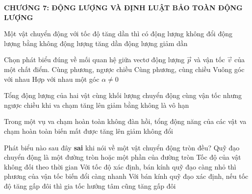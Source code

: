 \begin{center}
	\textbf{CHƯƠNG 7: ĐỘNG LƯỢNG VÀ ĐỊNH LUẬT BẢO TOÀN ĐỘNG LƯỢNG}
\end{center}

\begin{ex}
	Một vật chuyển động với tốc độ tăng dần thì có	
	\choice
	{động lượng không đổi}
	{động lượng bằng không}
	{\True động lượng tăng dần}
	{động lượng giảm dần}
	\loigiai{}
\end{ex}
\begin{ex}
	Chọn phát biểu đúng về mối quan hệ giữa vectơ động lượng $\vec{p}$ và vận tốc $\vec{v}$ của một chất điểm.
	\choice
	{Cùng phương, ngược chiều}
	{\True Cùng phương, cùng chiều}
	{Vuông góc với nhau}
	{Hợp với nhau một góc $\alpha \neq 0$}
	\loigiai{}
\end{ex}




\begin{ex}
	Tổng động lượng của hai vật cùng khối lượng chuyển động cùng vận tốc nhưng ngược chiều khi va chạm
	\choice
	{tăng lên}
	{giảm}
	{\True bằng không}
	{là vô hạn}
	\loigiai{}
\end{ex}
\begin{ex}
	Trong một vụ va chạm hoàn toàn không đàn hồi, tổng động năng của các vật va chạm
	\choice
	{hoàn toàn biến mất}
	{được tăng lên}
	{\True giảm}
	{không đổi}
	\loigiai{}
\end{ex}
\begin{ex}
	Phát biểu nào sau đây \textbf{sai} khi nói về một vật chuyển động tròn đều?
	\choice
	{Quỹ đạo chuyển động là một đường tròn hoặc một phần của đường tròn}
	{Tốc độ của vật không đối theo thời gian}
	{Với tốc độ xác định, bán kính quỹ đạo càng nhỏ thì phương của vận tốc biến đổi càng nhanh}
	{\True Với bán kính quỹ đạo xác định, nếu tốc độ tăng gấp đôi thì gia tốc hướng tâm cũng tăng gấp đôi}
	\loigiai{}
\end{ex}

